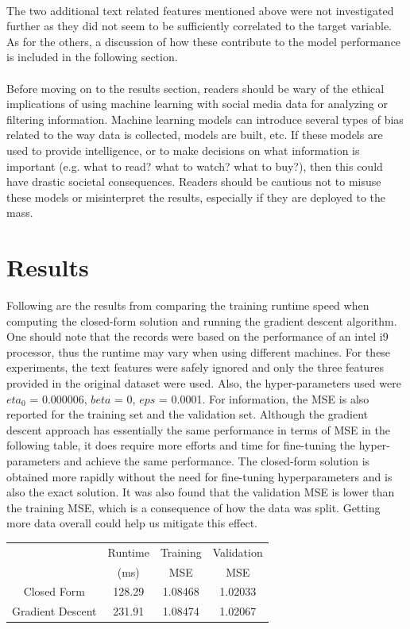 \documentclass[11pt]{article}
\begin{document}
\\
The two additional text related features mentioned above were not investigated further as they did not seem to be sufficiently correlated to the target variable. As for the others, a discussion of how these contribute to the model performance is included in the following section.\\
\\
Before moving on to the results section, readers should be wary of the ethical implications of using machine learning with social media data for analyzing or filtering information. Machine learning models can introduce several types of bias related to the way data is collected, models are built, etc. If these models are used to provide intelligence, or to make decisions on what information is important (e.g. what to read? what to watch? what to buy?), then this could have drastic societal consequences.  Readers should be cautious not to misuse these models or misinterpret the results, especially if they are deployed to the mass.\\

\section{Results}

Following are the results from comparing the training runtime speed when computing the closed-form solution and running the gradient descent algorithm. One should note that the records were based on the performance of an intel i9 processor, thus the runtime may vary when using different machines.  For these experiments, the text features were safely ignored and only the three features provided in the original dataset were used. Also, the hyper-parameters used were $eta_0$ = 0.000006, $beta$ = 0, $eps$ = 0.0001. For information, the MSE is also reported for the training set and the validation set. Although the gradient descent approach has essentially the same performance in terms of MSE in the following table, it does require more efforts and time for fine-tuning the hyper-parameters and achieve the same performance. The closed-form solution is obtained more rapidly without the need for fine-tuning hyperparameters and is also the exact solution.  It was also found that the validation MSE is lower than the training MSE, which is a consequence of how the data was split. Getting more data overall could help us mitigate this effect. \\

\begin{table}[h]
\centering
\begin{small}
\begin{tabular}[c]{|c|c|c|c|}
  \hline
   & Runtime & Training & Validation \\
   & (ms) & MSE & MSE \\
   \hline
  Closed Form & 128.29 & 1.08468 & 1.02033\\
  Gradient Descent & 231.91 & 1.08474 & 1.02067\\
  \hline
\end{tabular}
\end{small}
\end{table}
\end{document}
